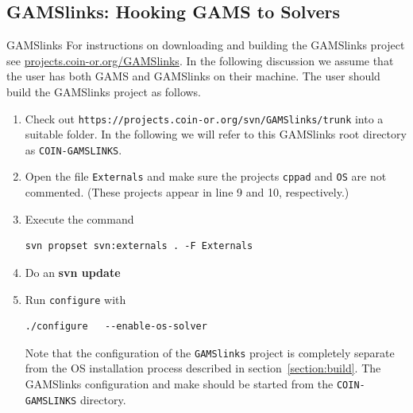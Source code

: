 \documentclass[11pt]{article}
\renewcommand{\_}{{\char"5F}}
\renewcommand{\{}{{\char"7B}}
\renewcommand{\}}{{\char"7D}}
\renewcommand{\^}{{\char"0D}}
\renewcommand{\'}{{\char"0D}}
\newcommand{\UrlGamslinks}{https://projects.coin-or.org/svn/GAMSlinks/trunk}
\begin{document}
\begin{enumerate}[Step 1:]
\subsection{GAMSlinks:  Hooking GAMS to Solvers}\label{section:gamslinks}


GAMSlinks
For instructions on downloading and building  the GAMSlinks project see \url{projects.coin-or.org/GAMSlinks}.
In the following discussion we assume that the user has both GAMS and GAMSlinks on their machine.
The user should build the GAMSlinks project as follows.

\begin{enumerate}[1.]

\item  Check out {\tt\UrlGamslinks} into a suitable folder. In the following we
will refer to this GAMSlinks root directory as {\tt COIN-GAMSLINKS}.

\item Open the file {\tt Externals} and make sure the projects {\tt cppad} and {\tt OS} are not commented.
(These projects appear in line 9 and 10, respectively.)

\item Execute the command

\begin{verbatim}
svn propset svn:externals . -F Externals
\end{verbatim}


\item  Do an {\bf svn update}

\item Run {\tt configure} with

\begin{verbatim}
./configure   --enable-os-solver
\end{verbatim}

Note that the configuration of the {\tt GAMSlinks} project is completely separate from the OS installation process
described in section~\ref{section:build}. The GAMSlinks configuration and make should be started from the
{\tt COIN-GAMSLINKS} directory.


\end{enumerate}
\end{enumerate}
\end{document}
